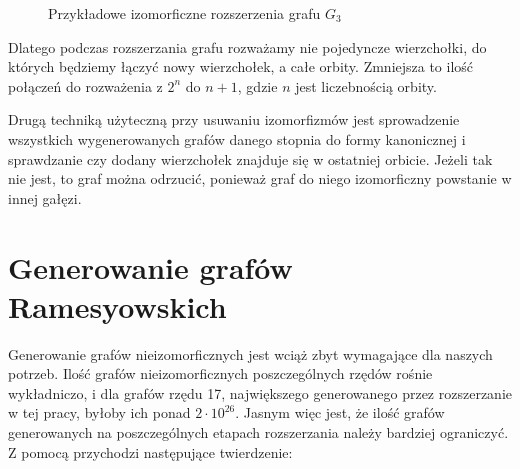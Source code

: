 \begin{figure}[H]
  \centering

  \hspace{15mm}
  \caption{Przykładowe izomorficzne rozszerzenia grafu $G_3$}
	\label{g2extend}
\end{figure} 

Dlatego podczas rozszerzania grafu rozważamy nie pojedyncze wierzchołki, do których będziemy łączyć nowy wierzchołek, 
a całe orbity. Zmniejsza to ilość połączeń do rozważenia z $2^n$ do $n+1$, gdzie $n$ jest liczebnością orbity. 

Drugą techniką użyteczną przy usuwaniu izomorfizmów jest sprowadzenie wszystkich wygenerowanych grafów danego stopnia do formy kanonicznej 
i sprawdzanie czy dodany wierzchołek znajduje się w ostatniej orbicie. Jeżeli tak nie jest, to graf można odrzucić, ponieważ graf do niego
izomorficzny powstanie w innej gałęzi. 





\section{Generowanie grafów Ramesyowskich}

Generowanie grafów nieizomorficznych jest wciąż zbyt wymagające dla naszych potrzeb. Ilość grafów nieizomorficznych poszczególnych rzędów rośnie wykładniczo, i dla grafów rzędu 17, największego generowanego przez rozszerzanie w tej pracy, byłoby ich ponad $2 \cdot 10^{26}$\cite{OEIS}. Jasnym więc jest, że ilość grafów generowanych na poszczególnych etapach rozszerzania należy bardziej ograniczyć. Z pomocą przychodzi następujące twierdzenie: 


